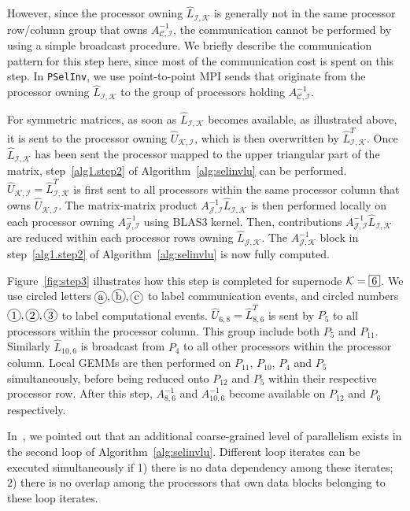 \documentclass{acm_proc_article-sp}
\DeclareRobustCommand\circled[1]{\tikz[baseline=(char.base)]{ \node[shape=circle, fill=white,draw,inner sep=0pt,text width= 1 em ,minimum size = 1 em, text centered] (char) {#1};}}
\DeclareRobustCommand\supernode[1]{\tikz[baseline=(char.base)]{ \node[shape=rectangle, fill=white,draw,inner sep=0pt,text width= 1 em ,minimum size = 1 em, text centered] (char) {#1};}}
\newcommand{\CS}{\ensuremath{\mathcal C}\xspace}
\newcommand{\JS}{\ensuremath{\mathcal J}\xspace}
\newcommand{\IS}{\ensuremath{\mathcal I}\xspace}
\newcommand{\KS}{\ensuremath{\mathcal K}\xspace}
\newcommand{\pselinv}{\texttt{PSelInv}\xspace}
\begin{document}
However, since the processor owning $\hat{L}_{\IS,\KS}$ is 
generally not in the same processor row/column group that owns $A^{-1}_{\CS,\IS}$,
the communication cannot be performed by using a simple broadcast
procedure. We briefly describe the communication pattern for this step
here, since most of the communication cost is spent on this step.
In \pselinv, we use point-to-point MPI sends that originate 
from the processor owning $\hat{L}_{\IS,\KS}$ to the group of processors 
holding $A^{-1}_{\CS,\IS}$. 

For symmetric matrices, as soon as $\hat{L}_{\IS,\KS}$ becomes available,
as illustrated above, it is sent to the processor owning
$\hat{U}_{\KS,\IS}$, which is then overwritten by
$\hat{L}_{\IS,\KS}^{T}$. 
Once $\hat{L}_{\IS,\KS}$ has been sent the processor
mapped to the upper triangular part of the matrix,
step~\ref{alg1.step2} of Algorithm~\ref{alg:selinvlu} can be performed.
$\hat{U}_{\KS,\IS}=\hat{L}^{T}_{\IS,\KS}$ is first sent to all
processors within the same processor column that owns
$\hat{U}_{\KS,\IS}$.  The matrix-matrix product
$A^{-1}_{\JS,\IS}\hat{L}_{\IS,\KS}$ is then performed locally on each
processor owning $A^{-1}_{\JS,\IS}$ using BLAS3 kernel.
Then, contributions $A^{-1}_{\JS,\IS}\hat{L}_{\IS,\KS}$ are 
reduced within each processor rows owning $\hat{L}_{\JS,\KS}$. 
The $A^{-1}_{\JS,\KS}$ block in step~\ref{alg1.step2} of
Algorithm~\ref{alg:selinvlu} is now fully computed. 

Figure~\ref{fig:step3} illustrates how this step is completed for 
supernode $\KS=\supernode{6}$. We use circled letters
$\circled{a}, \circled{b}, \circled{c}$ to label 
communication events, and circled numbers
$\circled{1}, \circled{2}, \circled{3}$ to label computational events. 
$\hat{U}_{6,8}=\hat{L}_{8,6}^{T}$ is sent by $P_5$ 
to all processors within the processor column.
This group include both $P_{5}$ and $P_{11}$.  
Similarly $\hat{L}_{10,6}$ is broadcast from $P_4$ to all
other processors within the processor column.
Local GEMMs are then performed on 
$P_{11}$, $P_{10}$, $P_{4}$ and $P_5$ simultaneously, before being
reduced onto $P_{12}$ and $P_{5}$ within their respective processor row.
After this step, $A^{-1}_{8,6}$ and $A^{-1}_{10,6}$ become available on
$P_{12}$ and $P_{6}$ respectively.

In~\cite{JacquelinLinYang2014}, we pointed out that an additional 
coarse-grained level of parallelism exists in the second loop 
of Algorithm~\ref{alg:selinvlu}. Different loop iterates can be
executed simultaneously if 1) there is no data dependency among these 
iterates; 2) there is no overlap among the processors that own data blocks
belonging to these loop iterates.
\end{document}
